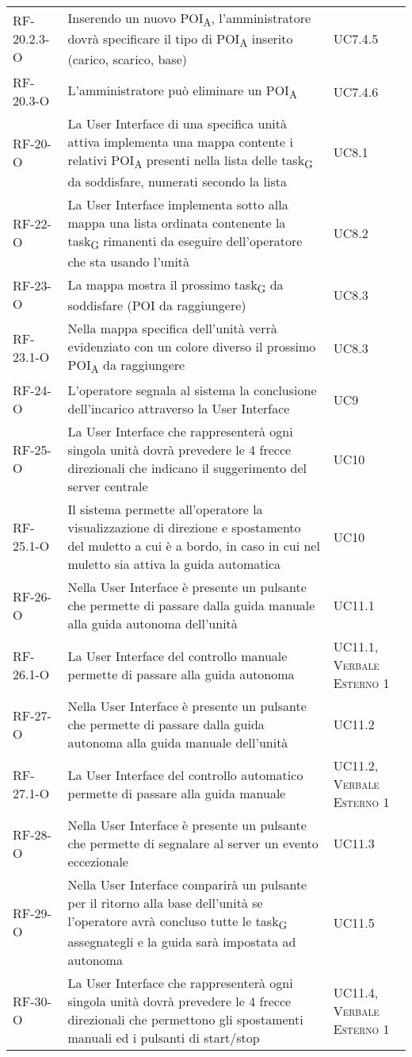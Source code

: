 \begin{longtable}{ 
		>{}p{} 
		>{}p{}
		>{\centering}p{} }
RF-20.2.3-O	&	Inserendo un nuovo POI\textsubscript{A}, l'amministratore dovrà specificare il tipo di POI\textsubscript{A} inserito (carico, scarico, base)	&	UC7.4.5\tabularnewline
RF-20.3-O		&	L'amministratore può eliminare un POI\textsubscript{A}	&	UC7.4.6\tabularnewline
RF-20-O		&	La User Interface di una specifica unità attiva implementa una mappa contente i relativi POI\textsubscript{A} presenti nella lista delle task\textsubscript{G} da soddisfare, numerati secondo la lista	&	UC8.1\tabularnewline
RF-22-O		&	La User Interface implementa sotto alla mappa una lista ordinata contenente la task\textsubscript{G} rimanenti da eseguire dell'operatore che sta usando l'unità	&	UC8.2\tabularnewline
RF-23-O		&	La mappa mostra il prossimo task\textsubscript{G} da soddisfare (POI da raggiungere) 	&	UC8.3\tabularnewline
RF-23.1-O		&	Nella mappa specifica dell'unità verrà evidenziato con un colore diverso il prossimo POI\textsubscript{A} da raggiungere	&	UC8.3\tabularnewline
RF-24-O		&	L'operatore segnala al sistema la conclusione dell'incarico attraverso la User Interface	&	UC9\tabularnewline				
RF-25-O		&	La User Interface che rappresenterà ogni singola unità dovrà prevedere le 4 frecce direzionali che indicano il suggerimento del server centrale	&	UC10\tabularnewline
RF-25.1-O		&	Il sistema permette all'operatore la visualizzazione di direzione e spostamento del muletto a cui è a bordo, in caso in cui nel muletto sia attiva la guida automatica 	&	UC10\tabularnewline				
RF-26-O		&	Nella User Interface è presente un pulsante che permette di passare dalla guida manuale alla guida autonoma dell'unità	&	UC11.1\tabularnewline
RF-26.1-O		&	La User Interface del controllo manuale permette di passare alla guida autonoma	&	UC11.1, \textsc{\textsc{Verbale Esterno 1}}\tabularnewline
RF-27-O		&	Nella User Interface è presente un pulsante che permette di passare dalla guida autonoma alla guida manuale dell'unità	&	UC11.2\tabularnewline
RF-27.1-O		&	La User Interface del controllo automatico permette di passare alla guida manuale	&	UC11.2, \textsc{\textsc{Verbale Esterno 1}}\tabularnewline
RF-28-O		&	Nella User Interface è presente un pulsante che permette di segnalare al server un evento eccezionale	&	UC11.3\tabularnewline
RF-29-O		&	Nella User Interface comparirà  un pulsante per il ritorno alla base dell'unità se l'operatore avrà concluso tutte le task\textsubscript{G} assegnategli e la guida sarà impostata ad autonoma 	&	UC11.5\tabularnewline 
RF-30-O		&	La User Interface che rappresenterà ogni singola unità dovrà prevedere le 4 frecce direzionali che permettono gli spostamenti manuali ed i pulsanti di start/stop	&	UC11.4, \textsc{\textsc{Verbale Esterno 1}}\tabularnewline

\end{longtable}
